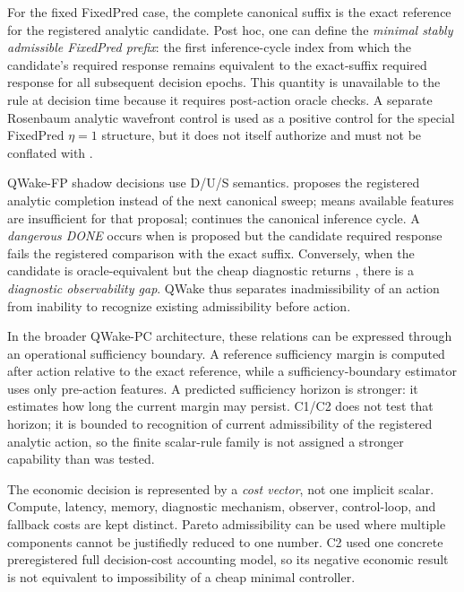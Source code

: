 For the fixed FixedPred case, the complete canonical suffix is the exact reference for
the registered analytic candidate. Post hoc, one can define the \emph{minimal stably
admissible FixedPred prefix}: the first inference-cycle index from which the candidate's
required response remains equivalent to the exact-suffix required response for all
subsequent decision epochs. This quantity is unavailable to the rule at decision time
because it requires post-action oracle checks. A separate Rosenbaum analytic wavefront
control is used as a positive control for the special FixedPred $\eta=1$ structure,
but it does not itself authorize  and must not be conflated
with .

QWake-FP shadow decisions use D/U/S semantics.  proposes the registered
analytic completion instead of the next canonical sweep;  means
available features are insufficient for that proposal;  continues the
canonical inference cycle. A \emph{dangerous DONE} occurs when  is proposed
but the candidate required response fails the registered comparison with the exact
suffix. Conversely, when the candidate is oracle-equivalent but the cheap diagnostic
returns , there is a \emph{diagnostic observability gap}. QWake thus
separates inadmissibility of an action from inability to recognize existing
admissibility before action.

In the broader QWake-PC architecture, these relations can be expressed through an
operational sufficiency boundary. A reference sufficiency margin is computed after
action relative to the exact reference, while a sufficiency-boundary estimator uses
only pre-action features. A predicted sufficiency horizon is stronger: it estimates
how long the current margin may persist. C1/C2 does not test that horizon; it is bounded
to recognition of current admissibility of the registered analytic action, so the
finite scalar-rule family is not assigned a stronger capability than was tested.

The economic decision is represented by a \emph{cost vector}, not one implicit scalar.
Compute, latency, memory, diagnostic mechanism, observer, control-loop, and fallback
costs are kept distinct. Pareto admissibility can be used where multiple components
cannot be justifiedly reduced to one number. C2 used one concrete preregistered full
decision-cost accounting model, so its negative economic result is not equivalent to
impossibility of a cheap minimal controller.


